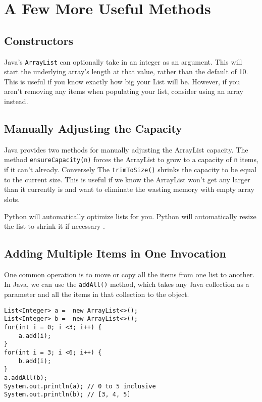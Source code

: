 \section{A Few More Useful Methods}

\subsection{Constructors}
Java's \texttt{ArrayList} can optionally take in an integer as an argument.
This will start the underlying array's length at that value, rather than the default of 10.
This is useful if you know exactly how big your List will be.  
However, if you aren't removing any items when populating your list, consider using an array instead.

\subsection{Manually Adjusting the Capacity}

Java provides two methods for manually adjusting the ArrayList capacity.   
The method \texttt{ensureCapacity(n)} forces the ArrayList to grow  to a capacity of \texttt{n} items, if it can't already.
Conversely The \texttt{trimToSize()} shrinks the capacity to be equal to the current size.  This is useful if we know the ArrayList won't get any larger than it currently is and want to eliminate the wasting memory with empty array slots.

Python will automatically optimize lists for you.  Python will automatically resize the list to shrink it if necessary \cite{py-list-source}.


\subsection{Adding Multiple Items in One Invocation}
One common operation is to move or copy all the items from one list to another.
In Java, we can use the \texttt{addAll()} method, which takes any Java collection as a parameter and all the items in that collection to the object.

\begin{verbatim}
List<Integer> a =  new ArrayList<>();
List<Integer> b =  new ArrayList<>();
for(int i = 0; i <3; i++) { 
	a.add(i); 
}
for(int i = 3; i <6; i++) { 
	b.add(i); 
}
a.addAll(b);
System.out.println(a); // 0 to 5 inclusive
System.out.println(b); // [3, 4, 5]
\end{verbatim}

